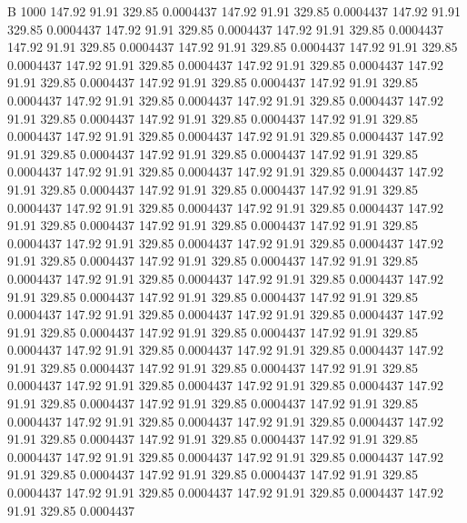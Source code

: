 


B 1000
 147.92   91.91  329.85   0.0004437
 147.92   91.91  329.85   0.0004437
 147.92   91.91  329.85   0.0004437
 147.92   91.91  329.85   0.0004437
 147.92   91.91  329.85   0.0004437
 147.92   91.91  329.85   0.0004437
 147.92   91.91  329.85   0.0004437
 147.92   91.91  329.85   0.0004437
 147.92   91.91  329.85   0.0004437
 147.92   91.91  329.85   0.0004437
 147.92   91.91  329.85   0.0004437
 147.92   91.91  329.85   0.0004437
 147.92   91.91  329.85   0.0004437
 147.92   91.91  329.85   0.0004437
 147.92   91.91  329.85   0.0004437
 147.92   91.91  329.85   0.0004437
 147.92   91.91  329.85   0.0004437
 147.92   91.91  329.85   0.0004437
 147.92   91.91  329.85   0.0004437
 147.92   91.91  329.85   0.0004437
 147.92   91.91  329.85   0.0004437
 147.92   91.91  329.85   0.0004437
 147.92   91.91  329.85   0.0004437
 147.92   91.91  329.85   0.0004437
 147.92   91.91  329.85   0.0004437
 147.92   91.91  329.85   0.0004437
 147.92   91.91  329.85   0.0004437
 147.92   91.91  329.85   0.0004437
 147.92   91.91  329.85   0.0004437
 147.92   91.91  329.85   0.0004437
 147.92   91.91  329.85   0.0004437
 147.92   91.91  329.85   0.0004437
 147.92   91.91  329.85   0.0004437
 147.92   91.91  329.85   0.0004437
 147.92   91.91  329.85   0.0004437
 147.92   91.91  329.85   0.0004437
 147.92   91.91  329.85   0.0004437
 147.92   91.91  329.85   0.0004437
 147.92   91.91  329.85   0.0004437
 147.92   91.91  329.85   0.0004437
 147.92   91.91  329.85   0.0004437
 147.92   91.91  329.85   0.0004437
 147.92   91.91  329.85   0.0004437
 147.92   91.91  329.85   0.0004437
 147.92   91.91  329.85   0.0004437
 147.92   91.91  329.85   0.0004437
 147.92   91.91  329.85   0.0004437
 147.92   91.91  329.85   0.0004437
 147.92   91.91  329.85   0.0004437
 147.92   91.91  329.85   0.0004437
 147.92   91.91  329.85   0.0004437
 147.92   91.91  329.85   0.0004437
 147.92   91.91  329.85   0.0004437
 147.92   91.91  329.85   0.0004437
 147.92   91.91  329.85   0.0004437
 147.92   91.91  329.85   0.0004437
 147.92   91.91  329.85   0.0004437
 147.92   91.91  329.85   0.0004437
 147.92   91.91  329.85   0.0004437
 147.92   91.91  329.85   0.0004437
 147.92   91.91  329.85   0.0004437
 147.92   91.91  329.85   0.0004437
 147.92   91.91  329.85   0.0004437
 147.92   91.91  329.85   0.0004437
 147.92   91.91  329.85   0.0004437
 147.92   91.91  329.85   0.0004437
 147.92   91.91  329.85   0.0004437
 147.92   91.91  329.85   0.0004437
 147.92   91.91  329.85   0.0004437
 147.92   91.91  329.85   0.0004437
 147.92   91.91  329.85   0.0004437
